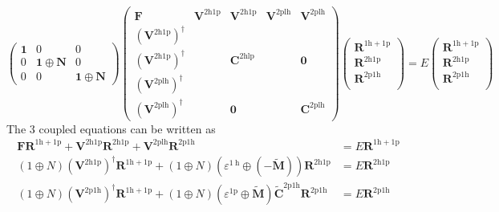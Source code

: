 \begin{equation}
\begin{pmatrix}
\bm{1} & 0 & 0 \\
0 & \bm{1} \oplus \bm{N} & 0 \\
0 & 0 & \bm{1} \oplus \bm{N}
\end{pmatrix}
\begin{pmatrix}
\bm{F} & \bm{V}^{2\mathrm{h1p}} & \bm{V}^{2\mathrm{h1p}} & \bm{V}^{2\mathrm{plh}} & \bm{V}^{2\mathrm{plh}} \\
\left(\bm{V}^{2\mathrm{h1p}}\right)^{\dagger} &  &  & & \\
\left(\bm{V}^{2\mathrm{h1p}}\right)^{\dagger} &  & \bm{C}^{2\mathrm{hlp}} & & \bm{0} \\
\left(\bm{V}^{2\mathrm{plh}}\right)^{\dagger} & & & & \\
\left(\bm{V}^{2\mathrm{plh}}\right)^{\dagger} &  & \bm{0} & & \bm{C}^{2\mathrm{plh}}
\end{pmatrix}
\begin{pmatrix}
\bm{R}^{1\mathrm{h}+1\mathrm{p}} \\
\bm{R}^{2\mathrm{h}1\mathrm{p}} \\
\bm{R}^{2\mathrm{p}1\mathrm{h}} \\
\end{pmatrix} = E
\begin{pmatrix}
\bm{R}^{1\mathrm{h}+1\mathrm{p}} \\
\bm{R}^{2\mathrm{h}1\mathrm{p}} \\
\bm{R}^{2\mathrm{p}1\mathrm{h}} \\
\end{pmatrix}
\end{equation}
The 3 coupled equations can be written as
\begin{align}
\bm{F} \bm{R}^{1\mathrm{h}+1\mathrm{p}} +\bm{V}^{2\mathrm{h}1\mathrm{p}} \bm{R}^{2\mathrm{h}1\mathrm{p}}  + \bm{V}^{2\mathrm{plh}} \bm{R}^{2\mathrm{p}1\mathrm{h}} &= E \bm{R}^{1\mathrm{h}+1\mathrm{p}} \\
 \left(1\oplus N\right)\left(\bm{V}^{2\mathrm{h}1\mathrm{p}}\right)^{\dagger} \bm{R}^{1\mathrm{h}+1\mathrm{p}} + \left(1\oplus N\right) \left(\varepsilon^{1\mathrm{~h}} \oplus (-\bm{\tilde{M}})\right)\bm{R}^{2\mathrm{h}1\mathrm{p}} &= E \bm{R}^{2\mathrm{h}1\mathrm{p}} \\
\left(1\oplus N\right)\left(\bm{V}^{2\mathrm{p}1\mathrm{h}}\right)^\dagger \bm{R}^{1\mathrm{h}+1\mathrm{p}} + \left(1\oplus N\right)\left(\varepsilon^{1\mathrm{p}} \oplus \bm{\tilde{M}}\right)\bm{\tilde{C}}^{2\mathrm{p}1\mathrm{h}}\bm{R}^{2\mathrm{p}1\mathrm{h}} &= E \bm{R}^{2\mathrm{p}1\mathrm{h}}
\end{align}
